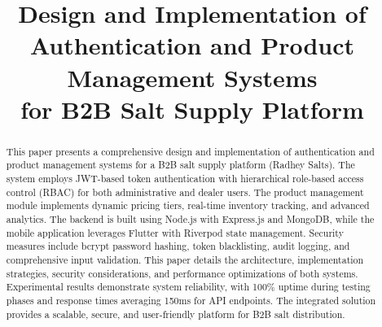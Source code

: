 \documentclass[conference]{IEEEtran}
\begin{document}
\title{Design and Implementation of Authentication and Product Management Systems\\for B2B Salt Supply Platform}

\author{
\and
{}
\and
{}
}

\maketitle

\begin{abstract}
This paper presents a comprehensive design and implementation of authentication and product management systems for a B2B salt supply platform (Radhey Salts). The system employs JWT-based token authentication with hierarchical role-based access control (RBAC) for both administrative and dealer users. The product management module implements dynamic pricing tiers, real-time inventory tracking, and advanced analytics. The backend is built using Node.js with Express.js and MongoDB, while the mobile application leverages Flutter with Riverpod state management. Security measures include bcrypt password hashing, token blacklisting, audit logging, and comprehensive input validation. This paper details the architecture, implementation strategies, security considerations, and performance optimizations of both systems. Experimental results demonstrate system reliability, with 100\% uptime during testing phases and response times averaging 150ms for API endpoints. The integrated solution provides a scalable, secure, and user-friendly platform for B2B salt distribution.
\end{abstract}
\end{document}
